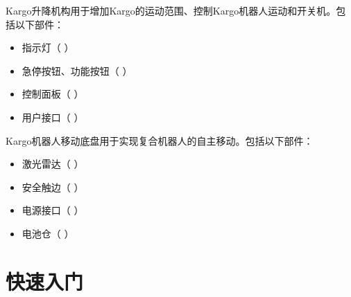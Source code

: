 \documentclass[a4paper,11pt,english,openany,oneside]{sphinxmanual}
\begin{document}
\sphinxAtStartPar
Kargo升降机构用于增加Kargo的运动范围、控制Kargo机器人运动和开关机。包括以下部件：
\begin{itemize}
\item {} 
\sphinxAtStartPar
指示灯（ {\hyperref[\detokenize{07 _u6280_u672f_u89c4_u683c:id18}]{}} ）

\item {} 
\sphinxAtStartPar
急停按钮、功能按钮（ {\hyperref[\detokenize{07 _u6280_u672f_u89c4_u683c:id22}]{}} ）

\item {} 
\sphinxAtStartPar
控制面板（ {\hyperref[\detokenize{07 _u6280_u672f_u89c4_u683c:id39}]{}} ）

\item {} 
\sphinxAtStartPar
用户接口（ {\hyperref[\detokenize{08 _u5b89_u88c5_u4e0e_u8c03_u8bd5:id44}]{}} ）

\end{itemize}

\sphinxAtStartPar
Kargo机器人移动底盘用于实现复合机器人的自主移动。包括以下部件：
\begin{itemize}
\item {} 
\sphinxAtStartPar
激光雷达（ {\hyperref[\detokenize{07 _u6280_u672f_u89c4_u683c:id35}]{}} ）

\item {} 
\sphinxAtStartPar
安全触边（ {\hyperref[\detokenize{07 _u6280_u672f_u89c4_u683c:id37}]{}} ）

\item {} 
\sphinxAtStartPar
电源接口（ {\hyperref[\detokenize{08 _u5b89_u88c5_u4e0e_u8c03_u8bd5:id19}]{}} ）

\item {} 
\sphinxAtStartPar
电池仓（ {\hyperref[\detokenize{08 _u5b89_u88c5_u4e0e_u8c03_u8bd5:id29}]{}} ）

\end{itemize}

\sphinxstepscope


\chapter{快速入门}
\label{\detokenize{06-1 _u5feb_u901f_u5165_u95e8:id1}}\label{\detokenize{06-1 _u5feb_u901f_u5165_u95e8:id2}}\label{\detokenize{06-1 _u5feb_u901f_u5165_u95e8::doc}}
\end{document}
